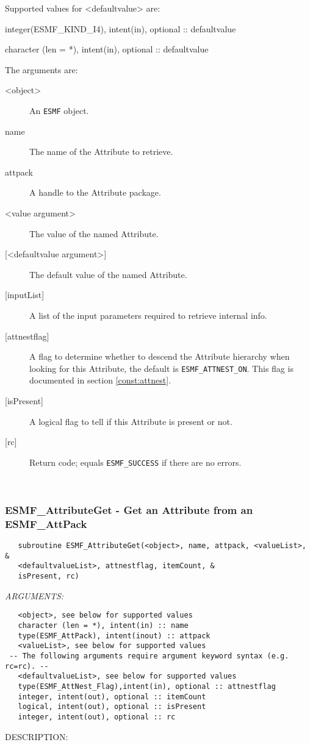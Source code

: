   Supported values for <defaultvalue> are:
   \begin{description}
   \item integer(ESMF\_KIND\_I4), intent(in), optional :: defaultvalue
   \item character (len = *), intent(in), optional :: defaultvalue
   \end{description}
  
   The arguments are:
   \begin{description}
   \item [<object>]
   An {\tt ESMF} object.
   \item [name]
   The name of the Attribute to retrieve.
   \item [attpack]
   A handle to the Attribute package.
   \item [<value argument>]
   The value of the named Attribute.
   \item [{[<defaultvalue argument>]}]
   The default value of the named Attribute.
   \item [{[inputList]}]
   A list of the input parameters required to retrieve internal info.
   \item [{[attnestflag]}]
   A flag to determine whether to descend the
   Attribute hierarchy when looking for this Attribute, the default
   is {\tt ESMF\_ATTNEST\_ON}. This flag is documented in section
   \ref{const:attnest}.
   \item [{[isPresent]}]
   A logical flag to tell if this Attribute is present or not.
   \item [{[rc]}]
   Return code; equals {\tt ESMF\_SUCCESS} if there are no errors.
   \end{description}
  
   
 
\mbox{}\hrulefill\ 
 
\subsubsection [ESMF\_AttributeGet] {ESMF\_AttributeGet - Get an Attribute from an ESMF\_AttPack}


  
\begin{verbatim}   subroutine ESMF_AttributeGet(<object>, name, attpack, <valueList>, &
   <defaultvalueList>, attnestflag, itemCount, &
   isPresent, rc)\end{verbatim}{\em ARGUMENTS:}
\begin{verbatim}   <object>, see below for supported values
   character (len = *), intent(in) :: name
   type(ESMF_AttPack), intent(inout) :: attpack
   <valueList>, see below for supported values
 -- The following arguments require argument keyword syntax (e.g. rc=rc). --
   <defaultvalueList>, see below for supported values
   type(ESMF_AttNest_Flag),intent(in), optional :: attnestflag
   integer, intent(out), optional :: itemCount
   logical, intent(out), optional :: isPresent
   integer, intent(out), optional :: rc\end{verbatim}
{\sf DESCRIPTION:\\ }



